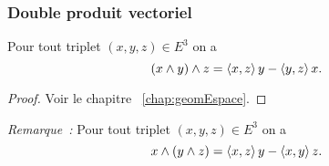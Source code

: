     \subsubsection{Double produit vectoriel}

    \begin{theo}
      Pour tout triplet \((x,y,z) \in E^3\) on a
      \begin{equation}
        (x \wedge y)\wedge z = \left\langle{x},{z}\right\rangle y-\left\langle{y},{z}\right\rangle x.
      \end{equation}
    \end{theo}
    \begin{proof}
      Voir le chapitre~
      \ref{chap:geomEspace}.
    \end{proof}
    \emph{Remarque~:} Pour tout triplet \((x,y,z) \in E^3\) on a
    \begin{equation}
      x \wedge (y \wedge z) = \left\langle{x},{z}\right\rangle y-\left\langle{x},{y}\right\rangle z.
    \end{equation}
